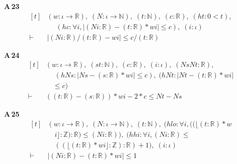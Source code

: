 \noindent\textbf{A\,23}\quad{}
{\footnotesize\[ \begin{aligned}[t]
&(\mathit{w} : \iota \to \mathbb{R} ),\; (\mathit{N} : \iota \to \mathbb{N} ),\; (\mathit{t} : \mathbb{N} ),\; (\mathit{c} : \mathbb{R} ),\; (\mathit{ht} : 0 < \mathit{t}),\\
&\quad \; (\mathit{hc} : \forall \mathit{i}, |(\mathit{N} \mathit{i} : \mathbb{R} ) - (\mathit{t} : \mathbb{R} ) * \mathit{w} \mathit{i}| \leq \mathit{c}),\; (\mathit{i} : \iota )\\
\vdash\;&|(\mathit{N} \mathit{i} : \mathbb{R} ) / (\mathit{t} : \mathbb{R} ) - \mathit{w} \mathit{i}| \leq \mathit{c} / (\mathit{t} : \mathbb{R} )
\end{aligned} \]}

\noindent\textbf{A\,24}\quad{}
{\footnotesize\[ \begin{aligned}[t]
&(\mathit{w} : \iota \to \mathbb{R} ),\; (\mathit{s} \mathit{t} : \mathbb{N} ),\; (\mathit{c} : \mathbb{R} ),\; (\mathit{i} : \iota ),\; (\mathit{Ns} \mathit{Nt} : \mathbb{R} ),\\
&\quad \; (\mathit{hNs} : |\mathit{Ns} - (\mathit{s} : \mathbb{R} ) * \mathit{w} \mathit{i}| \leq \mathit{c}),\; (\mathit{hNt} : |\mathit{Nt} - (\mathit{t} : \mathbb{R} ) * \mathit{w} \mathit{i}|\\
&\quad \leq \mathit{c})\\
\vdash\;&((\mathit{t} : \mathbb{R} ) - (\mathit{s} : \mathbb{R} )) * \mathit{w} \mathit{i} - 2 * \mathit{c} \leq \mathit{Nt} - \mathit{Ns}
\end{aligned} \]}

\noindent\textbf{A\,25}\quad{}
{\footnotesize\[ \begin{aligned}[t]
&(\mathit{w} : \iota \to \mathbb{R} ),\; (\mathit{N} : \iota \to \mathbb{N} ),\; (\mathit{t} : \mathbb{N} ),\; (\mathit{hlo} : \forall \mathit{i}, ((\lfloor (\mathit{t} : \mathbb{R} ) * \mathit{w}\\
&\quad \mathit{i}\rfloor : \mathbb{Z} ) : \mathbb{R} ) \leq (\mathit{N} \mathit{i} : \mathbb{R} )),\; (\mathit{hhi} : \forall \mathit{i}, (\mathit{N} \mathit{i} : \mathbb{R} ) \leq\\
&\quad ((\lfloor (\mathit{t} : \mathbb{R} ) * \mathit{w} \mathit{i}\rfloor : \mathbb{Z} ) : \mathbb{R} ) + 1),\; (\mathit{i} : \iota )\\
\vdash\;&|(\mathit{N} \mathit{i} : \mathbb{R} ) - (\mathit{t} : \mathbb{R} ) * \mathit{w} \mathit{i}| \leq 1
\end{aligned} \]}

